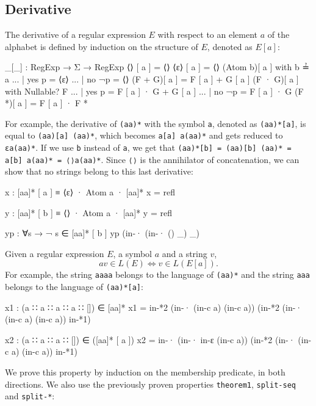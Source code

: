 \subsection{Derivative}
The derivative of a regular expression $E$ with respect to an element $a$ of the alphabet is defined by induction on the structure of $E$, denoted as $E[a]$:
\begin{agda}
_[_] : RegExp → Σ → RegExp
⟨⟩ [ a ]  = ⟨⟩
⟨ε⟩ [ a ] = ⟨⟩
(Atom b)[ a ] with b ≟ a
... | yes p  = ⟨ε⟩
... | no ¬p  = ⟨⟩
(F + G)[ a ] = F [ a ] + G [ a ]
(F · G)[ a ] with Nullable? F
... | yes p = F [ a ] · G + G [ a ]
... | no ¬p = F [ a ] · G
(F *)[ a ]  = F [ a ] · F *
\end{agda}
For example, the derivative of \texttt{(aa)*} with the symbol \texttt{a}, denoted as \texttt{(aa)*[a]}, is equal to \texttt{(aa)[a] (aa)*}, which becomes \texttt{a[a] a(aa)*} and gets reduced to \texttt{εa(aa)*}. If we use \texttt{b} instead of \texttt{a}, we get that \texttt{(aa)*[b] = (aa)[b] (aa)* = a[b] a(aa)* = ⟨⟩a(aa)*}. Since \texttt{⟨⟩} is the annihilator of concatenation, we can show that no strings belong to this last derivative:
\begin{agda}
x : [aa]* [ a ] ≡ ⟨ε⟩ · Atom a · [aa]*
x = refl

y : [aa]* [ b ] ≡ ⟨⟩ · Atom a · [aa]*
y = refl

yp : ∀{s} → ¬ s ∈ [aa]* [ b ]
yp (in-· (in-· () _) _)

\end{agda}
Given a regular expression $E$, a symbol $a$ and a string $v$, 
$$av \in L(E) \Leftrightarrow v \in L (E [ a ]).$$
For example, the string \texttt{aaaa} belongs to the language of \texttt{(aa)*} and the string \texttt{aaa} belongs to the language of \texttt{(aa)*[a]}:
\begin{agda}
x1 : (a ∷ a ∷ a ∷ a ∷ []) ∈ [aa]*
x1 = in-*2 (in-· (in-c a) (in-c a))
         (in-*2 (in-· (in-c a) (in-c a)) in-*1)

x2 : (a ∷ a ∷ a ∷ []) ∈ ([aa]* [ a ])
x2 = in-· (in-· in-ε (in-c a))
         (in-*2 (in-· (in-c a) (in-c a)) in-*1)
\end{agda}
We prove this property by induction on the membership predicate, in both directions. We also use the previously proven properties \texttt{theorem1}, \texttt{split-seq} and \texttt{split-*}:
